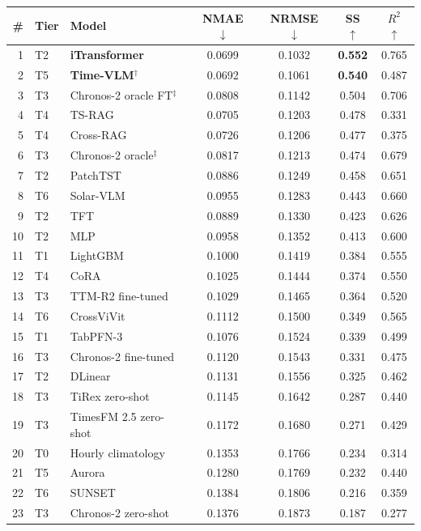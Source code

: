 \begin{table}[h!]
\centering
\small
\begin{tabular}{r l l c c c c}
\hline
\textbf{\#} & \textbf{Tier} & \textbf{Model} & \textbf{NMAE} $\downarrow$ &
\textbf{NRMSE} $\downarrow$ & \textbf{SS} $\uparrow$ & \textbf{$R^2$} $\uparrow$ \\
\hline
1 & T2 & \textbf{iTransformer} & 0.0699 & 0.1032 & \textbf{0.552} & 0.765 \\
2 & T5 & \textbf{Time-VLM}$^{\dagger}$ & 0.0692 & 0.1061 & \textbf{0.540} & 0.487 \\
3 & T3 & Chronos-2 oracle FT$^{\ddagger}$ & 0.0808 & 0.1142 & 0.504 & 0.706 \\
4 & T4 & TS-RAG & 0.0705 & 0.1203 & 0.478 & 0.331 \\
5 & T4 & Cross-RAG & 0.0726 & 0.1206 & 0.477 & 0.375 \\
6 & T3 & Chronos-2 oracle$^{\ddagger}$ & 0.0817 & 0.1213 & 0.474 & 0.679 \\
7 & T2 & PatchTST & 0.0886 & 0.1249 & 0.458 & 0.651 \\
8 & T6 & Solar-VLM & 0.0955 & 0.1283 & 0.443 & 0.660 \\
9 & T2 & TFT & 0.0889 & 0.1330 & 0.423 & 0.626 \\
10 & T2 & MLP & 0.0958 & 0.1352 & 0.413 & 0.600 \\
11 & T1 & LightGBM & 0.1000 & 0.1419 & 0.384 & 0.555 \\
12 & T4 & CoRA & 0.1025 & 0.1444 & 0.374 & 0.550 \\
13 & T3 & TTM-R2 fine-tuned & 0.1029 & 0.1465 & 0.364 & 0.520 \\
14 & T6 & CrossViVit & 0.1112 & 0.1500 & 0.349 & 0.565 \\
15 & T1 & TabPFN-3 & 0.1076 & 0.1524 & 0.339 & 0.499 \\
16 & T3 & Chronos-2 fine-tuned & 0.1120 & 0.1543 & 0.331 & 0.475 \\
17 & T2 & DLinear & 0.1131 & 0.1556 & 0.325 & 0.462 \\
18 & T3 & TiRex zero-shot & 0.1145 & 0.1642 & 0.287 & 0.440 \\
19 & T3 & TimesFM 2.5 zero-shot & 0.1172 & 0.1680 & 0.271 & 0.429 \\
20 & T0 & Hourly climatology & 0.1353 & 0.1766 & 0.234 & 0.314 \\
21 & T5 & Aurora & 0.1280 & 0.1769 & 0.232 & 0.440 \\
22 & T6 & SUNSET & 0.1384 & 0.1806 & 0.216 & 0.359 \\
23 & T3 & Chronos-2 zero-shot & 0.1376 & 0.1873 & 0.187 & 0.277 \\

\end{tabular}
\end{table}
